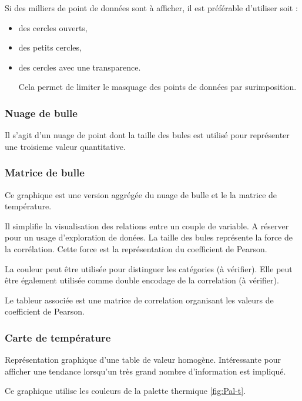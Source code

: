 \documentclass[a4paper,12pt]{article}
\begin{document}
\begin{multicols}{2}
Si des milliers de point de données sont à afficher, il est préférable d'utiliser soit :
\begin{itemize}
\item des cercles ouverts,
\item des petits cercles,\autocite{stephenfewComponentlevelGraphDesign2012}
\item des cercles avec une transparence.\autocite{stephenfewComponentlevelGraphDesign2012}

Cela permet de limiter le masquage des points de données par surimposition. \autocite{andreaskrauseBestPracticesData2024}
\end{itemize}
\subsubsection*{Nuage de bulle}
\label{sec:org7602551}
Il s'agit d'un nuage de point dont la taille des bules est utilisé pour représenter une troisieme valeur quantitative. \autocite{alansmithLexiqueVisuel}
\subsubsection*{Matrice de bulle}
\label{sec:org3de938f}
Ce graphique est une version aggrégée du nuage de bulle et le la matrice de température.

Il simplifie la visualisation des relations entre un couple de variable. A réserver pour un usage d'exploration de donées. \autocite{sosulskiGraphics2019} La taille des bules représente la force de la corrélation. Cette force est la représentation du coefficient de Pearson. \autocite{jonathanschwabishRelationship2021}

La couleur peut être utilisée pour distinguer les catégories (à vérifier). Elle peut être également utilisée comme double encodage de la correlation (à vérifier).

Le tableur associée est une matrice de correlation organisant les valeurs de coefficient de Pearson.
\subsubsection*{Carte de température}
\label{sec:orgffcb6c7}
Représentation graphique d'une table de valeur homogène. \autocite{sosulskiGraphics2019}
Intéressante pour afficher une tendance lorsqu'un très grand nombre d'information est impliqué.

Ce graphique utilise les couleurs de la palette thermique \ref{fig:Pal-t}.


\end{multicols}
\end{document}

